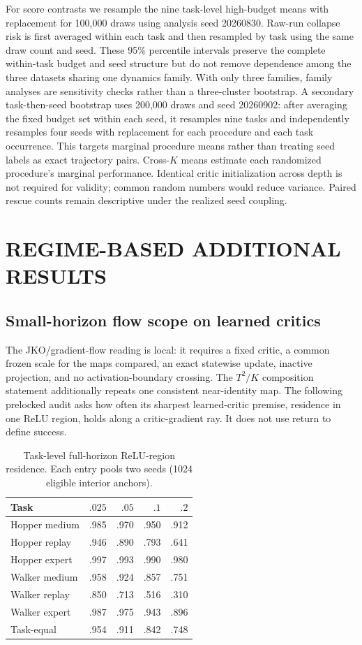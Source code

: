 \documentclass[twoside]{article}
\begin{document}
For score contrasts we resample the nine task-level high-budget means with
replacement for 100,000 draws using analysis seed 20260830. Raw-run collapse
risk is first averaged within each task and then resampled by task using the
same draw count and seed. These 95\% percentile intervals preserve the complete
within-task budget and seed structure but do not remove dependence among the
three datasets sharing one dynamics family. With only three families, family
analyses are sensitivity checks rather than a three-cluster bootstrap. A
secondary task-then-seed bootstrap uses 200,000 draws and seed 20260902: after
averaging the fixed budget set within each seed, it resamples nine tasks and
independently resamples four seeds with replacement for each procedure and each
task occurrence. This targets marginal procedure means rather than treating
seed labels as exact trajectory pairs.
Cross-$K$ means estimate each randomized procedure's marginal performance.
Identical critic initialization
across depth is not required for validity; common random numbers would reduce
variance. Paired rescue counts remain descriptive under the realized seed
coupling.

\section{REGIME-BASED ADDITIONAL RESULTS}
\label{app:results}

\subsection{Small-horizon flow scope on learned critics}

The JKO/gradient-flow reading is local: it requires a fixed critic, a common
frozen scale for the maps compared, an exact statewise update, inactive
projection, and no activation-boundary crossing. The $T^2/K$ composition
statement additionally repeats one consistent near-identity map.
The following prelocked audit asks how often its sharpest learned-critic
premise, residence in one ReLU region, holds along a critic-gradient ray. It
does not use return to define success.

\begin{table}[t]
\caption{Task-level full-horizon ReLU-region residence. Each entry pools two
seeds (1024 eligible interior anchors).}
\centering
\small
\setlength{\tabcolsep}{3pt}
\begin{tabular}{@{}lrrrr@{}}
\toprule
Task & $.025$ & $.05$ & $.1$ & $.2$\\
\midrule
Hopper medium &.985&.970&.950&.912\\
Hopper replay &.946&.890&.793&.641\\
Hopper expert &.997&.993&.990&.980\\
Walker medium &.958&.924&.857&.751\\
Walker replay &.850&.713&.516&.310\\
Walker expert &.987&.975&.943&.896\\
\midrule
Task-equal &.954&.911&.842&.748\\
\bottomrule
\end{tabular}
\label{tab:relu_residence}
\end{table}
\end{document}
